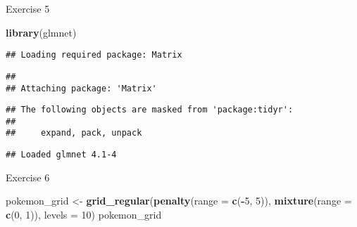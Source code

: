 \documentclass[]{article}
\newenvironment{Shaded}{\begin{snugshade}}{\end{snugshade}}
\newcommand{\DataTypeTok}[1]{\textcolor[rgb]{0.13,0.29,0.53}{#1}}
\newcommand{\DecValTok}[1]{\textcolor[rgb]{0.00,0.00,0.81}{#1}}
\newcommand{\KeywordTok}[1]{\textcolor[rgb]{0.13,0.29,0.53}{\textbf{#1}}}
\newcommand{\NormalTok}[1]{#1}
\newcommand{\OperatorTok}[1]{\textcolor[rgb]{0.81,0.36,0.00}{\textbf{#1}}}
\newcommand{\StringTok}[1]{\textcolor[rgb]{0.31,0.60,0.02}{#1}}
\begin{document}
Exercise 5

\begin{Shaded}
\begin{Highlighting}[]
\KeywordTok{library}\NormalTok{(glmnet)}
\end{Highlighting}
\end{Shaded}

\begin{verbatim}
## Loading required package: Matrix
\end{verbatim}

\begin{verbatim}
## 
## Attaching package: 'Matrix'
\end{verbatim}

\begin{verbatim}
## The following objects are masked from 'package:tidyr':
## 
##     expand, pack, unpack
\end{verbatim}

\begin{verbatim}
## Loaded glmnet 4.1-4
\end{verbatim}

\begin{Shaded}
\end{Shaded}

\begin{Shaded}
\end{Shaded}

Exercise 6

\begin{Shaded}
\begin{Highlighting}[]
\NormalTok{pokemon_grid <-}\StringTok{ }\KeywordTok{grid_regular}\NormalTok{(}\KeywordTok{penalty}\NormalTok{(}\DataTypeTok{range =} \KeywordTok{c}\NormalTok{(}\OperatorTok{-}\DecValTok{5}\NormalTok{, }\DecValTok{5}\NormalTok{)), }\KeywordTok{mixture}\NormalTok{(}\DataTypeTok{range =} \KeywordTok{c}\NormalTok{(}\DecValTok{0}\NormalTok{, }\DecValTok{1}\NormalTok{)), }\DataTypeTok{levels =} \DecValTok{10}\NormalTok{)}
\NormalTok{pokemon_grid}
\end{Highlighting}
\end{Shaded}
\end{document}
